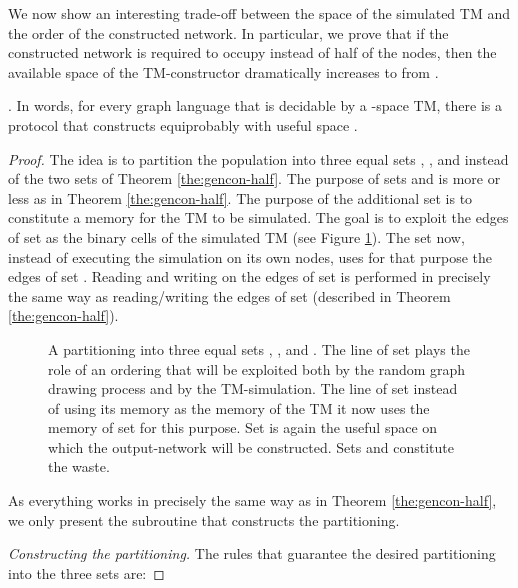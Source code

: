 \documentclass[oribibl, 11pt]{llncs}
\begin{document}
We now show an interesting trade-off between the space of the simulated TM and the order of the constructed network. In particular, we prove that if the constructed network is required to occupy  instead of half of the nodes, then the available space of the TM-constructor dramatically increases to  from .

\begin{theorem} 
. In words, for every graph language  that is decidable by a -space TM, there is a protocol that constructs  equiprobably with useful space .
\end{theorem}
\begin{proof}
The idea is to partition the population into three equal sets , , and  instead of the two sets of Theorem \ref{the:gencon-half}. The purpose of sets  and  is more or less as in Theorem \ref{the:gencon-half}. The purpose of the additional set  is to constitute a  memory for the TM to be simulated. The goal is to exploit the  edges of set  as the binary cells of the simulated TM (see Figure \ref{fig:gencon-one-third}). The set  now, instead of executing the simulation on its own nodes, uses for that purpose the edges of set . Reading and writing on the edges of set  is performed in precisely the same way as reading/writing the edges of set  (described in Theorem \ref{the:gencon-half}).

\begin{figure}[!hbtp]
\caption{A partitioning into three equal sets , , and . The line of set  plays the role of an ordering that will be exploited both by the random graph drawing process and by the TM-simulation. The line of set  instead of using its  memory as the memory of the TM it now uses the  memory of set  for this purpose. Set  is again the useful space on which the output-network will be constructed. Sets  and  constitute the waste.} \label{fig:gencon-one-third}
\end{figure}

As everything works in precisely the same way as in Theorem \ref{the:gencon-half}, we only present the subroutine that constructs the  partitioning.

\noindent\emph{Constructing the  partitioning.} The rules that guarantee the desired partitioning into the three sets are:


\end{proof}
\end{document}
